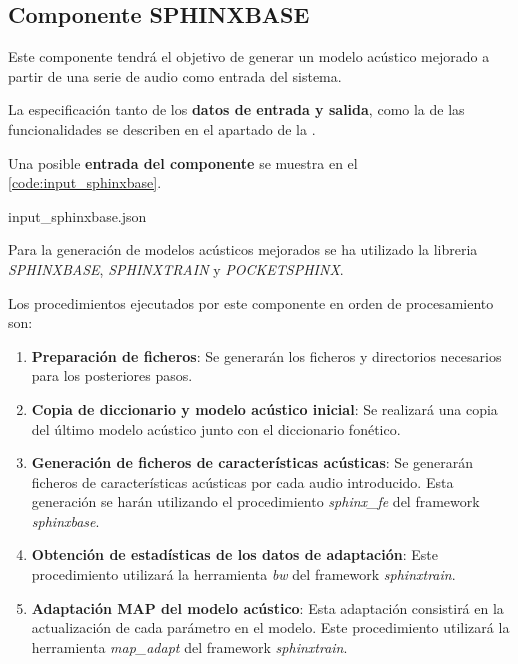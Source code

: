 \documentclass[../main.tex]{subfiles}
\begin{document}


\subsection{Componente SPHINXBASE}\label{subsec:impl_sphinxbase}
Este componente tendrá el objetivo de generar un modelo acústico mejorado a partir de una serie de audio como entrada del sistema.

La especificación tanto de los \textbf{datos de entrada y salida}, como la de las funcionalidades se describen en el apartado  de la .

Una posible \textbf{entrada del componente} se muestra en el \autoref{code:input_sphinxbase}.

                {input_sphinxbase.json}
                
Para la generación de modelos acústicos mejorados se ha utilizado la libreria \textit{SPHINXBASE}, \textit{SPHINXTRAIN} y \textit{POCKETSPHINX}.

Los procedimientos ejecutados por este componente en orden de procesamiento son:


\begin{enumerate}
    \item \textbf{Preparación de ficheros}: Se generarán los ficheros y directorios necesarios para los posteriores pasos.
    \item \textbf{Copia de diccionario y modelo acústico inicial}: Se realizará una copia del último modelo acústico junto con el diccionario fonético.
    \item \textbf{Generación de ficheros de características acústicas}: Se generarán ficheros de características acústicas por cada audio introducido. Esta generación se harán utilizando el procedimiento \textit{sphinx\_fe} del framework \textit{sphinxbase}.
    \item \textbf{Obtención de estadísticas de los datos de adaptación}: Este procedimiento utilizará la herramienta \textit{bw} del framework \textit{sphinxtrain}.
    \item \textbf{Adaptación MAP del modelo acústico}: Esta adaptación consistirá en la actualización de cada parámetro en el modelo. Este procedimiento utilizará la herramienta \textit{map\_adapt} del framework \textit{sphinxtrain}.
\end{enumerate}
\end{document}

